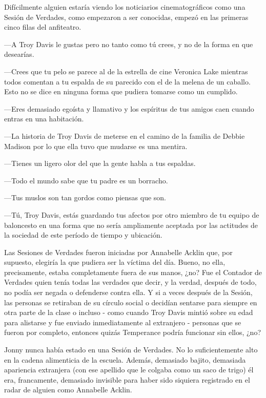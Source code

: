 Difícilmente alguien estaría viendo los noticiarios cinematográficos
como una Sesión de Verdades, como empezaron a ser conocidas, empezó en
las primeras cinco filas del anfiteatro.

---A Troy Davis le gustas pero no tanto como tú crees, y no de la forma
en que desearías.

---Crees que tu pelo se parece al de la estrella de cine Veronica Lake
mientras todos comentan a tu espalda de su parecido con el de la melena
de un caballo. Esto no se dice en ninguna forma que pudiera tomarse como
un cumplido.

---Eres demasiado egoísta y llamativo y los espíritus de tus amigos caen
cuando entras en una habitación.

---La historia de Troy Davis de meterse en el camino de la familia de
Debbie Madison por lo que ella tuvo que mudarse es una mentira.

---Tienes un ligero olor del que la gente habla a tus espaldas.

---Todo el mundo sabe que tu padre es un borracho.

---Tus muslos son tan gordos como piensas que son.

---Tú, Troy Davis, estás guardando tus afectos por otro miembro de tu
equipo de baloncesto en una forma que no sería ampliamente aceptada por
las actitudes de la sociedad de este período de tiempo y ubicación.

Las Sesiones de Verdades fueron iniciadas por Annabelle Acklin que, por
supuesto, elegiría la que pudiera ser la víctima del día. Bueno, no
ella, precisamente, estaba completamente fuera de sus manos, ¿no? Fue el
Contador de Verdades quien tenía todas las verdades que decir, y la
verdad, después de todo, no podía ser negada o defenderse contra ella. Y
si a veces después de la Sesión, las personas se retiraban de su círculo
social o decidían sentarse para siempre en otra parte de la clase o
incluso - como cuando Troy Davis mintió sobre su edad para alistarse y
fue enviado inmediatamente al extranjero - personas que se fueron por
completo, entonces quizás Temperance podría funcionar sin ellos, ¿no?

Jonny nunca había estado en una Sesión de Verdades. No lo
suficientemente alto en la cadena alimenticia de la escuela. Además,
demasiado bajito, demasiada apariencia extranjera (con ese apellido que
le colgaba como un saco de trigo) él era, francamente, demasiado
invisible para haber sido siquiera registrado en el radar de alguien
como Annabelle Acklin.

